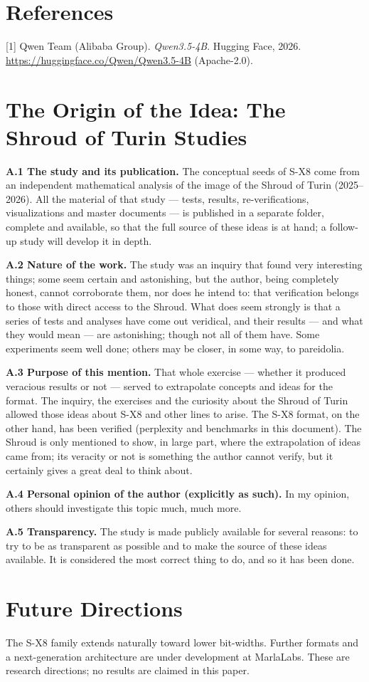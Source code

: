 \documentclass[11pt]{article}
\begin{document}
\section{References}
[1] Qwen Team (Alibaba Group). \emph{Qwen3.5-4B}. Hugging Face, 2026.
\url{https://huggingface.co/Qwen/Qwen3.5-4B} (Apache-2.0).

\appendix
\section{The Origin of the Idea: The Shroud of Turin Studies}
\textbf{A.1 The study and its publication.} The conceptual seeds of S-X8 come from an independent
mathematical analysis of the image of the Shroud of Turin (2025--2026). All the material of that study
--- tests, results, re-verifications, visualizations and master documents --- is published in a separate
folder, complete and available, so that the full source of these ideas is at hand; a follow-up study will
develop it in depth.

\textbf{A.2 Nature of the work.} The study was an inquiry that found very interesting things; some seem
certain and astonishing, but the author, being completely honest, cannot corroborate them, nor does he
intend to: that verification belongs to those with direct access to the Shroud. What does seem strongly is
that a series of tests and analyses have come out veridical, and their results --- and what they would
mean --- are astonishing; though not all of them have. Some experiments seem well done; others may be
closer, in some way, to pareidolia.

\textbf{A.3 Purpose of this mention.} That whole exercise --- whether it produced veracious results or not
--- served to extrapolate concepts and ideas for the format. The inquiry, the exercises and the curiosity
about the Shroud of Turin allowed those ideas about S-X8 and other lines to arise. The S-X8 format, on
the other hand, has been verified (perplexity and benchmarks in this document). The Shroud is only
mentioned to show, in large part, where the extrapolation of ideas came from; its veracity or not is
something the author cannot verify, but it certainly gives a great deal to think about.

\textbf{A.4 Personal opinion of the author (explicitly as such).} In my opinion, others should investigate
this topic much, much more.

\textbf{A.5 Transparency.} The study is made publicly available for several reasons: to try to be as
transparent as possible and to make the source of these ideas available. It is considered the most correct
thing to do, and so it has been done.

\section{Future Directions}
The S-X8 family extends naturally toward lower bit-widths. Further formats and a next-generation
architecture are under development at MarlaLabs. These are research directions; no results are claimed in
this paper.
\end{document}

